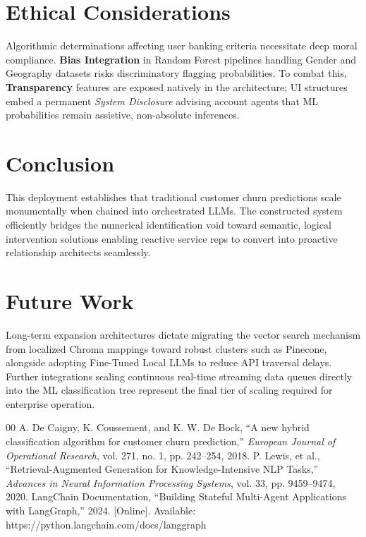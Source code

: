 \documentclass[conference, a4paper]{IEEEtran}
\begin{document}
\section{Ethical Considerations}
Algorithmic determinations affecting user banking criteria necessitate deep moral compliance. \textbf{Bias Integration} in Random Forest pipelines handling Gender and Geography datasets risks discriminatory flagging probabilities. To combat this, \textbf{Transparency} features are exposed natively in the architecture; UI structures embed a permanent \textit{System Disclosure} advising account agents that ML probabilities remain assistive, non-absolute inferences. 

\section{Conclusion}
This deployment establishes that traditional customer churn predictions scale monumentally when chained into orchestrated LLMs. The constructed system efficiently bridges the numerical identification void toward semantic, logical intervention solutions enabling reactive service reps to convert into proactive relationship architects seamlessly. 

\section{Future Work}
Long-term expansion architectures dictate migrating the vector search mechanism from localized Chroma mappings toward robust clusters such as Pinecone, alongside adopting Fine-Tuned Local LLMs to reduce API traversal delays. Further integrations scaling continuous real-time streaming data queues directly into the ML classification tree represent the final tier of scaling required for enterprise operation.

\begin{thebibliography}{00}
 A. De Caigny, K. Coussement, and K. W. De Bock, ``A new hybrid classification algorithm for customer churn prediction,'' \textit{European Journal of Operational Research}, vol. 271, no. 1, pp. 242--254, 2018.
 P. Lewis, et al., ``Retrieval-Augmented Generation for Knowledge-Intensive NLP Tasks,'' \textit{Advances in Neural Information Processing Systems}, vol. 33, pp. 9459--9474, 2020.
 LangChain Documentation, ``Building Stateful Multi-Agent Applications with LangGraph,'' 2024. [Online]. Available: https://python.langchain.com/docs/langgraph
\end{thebibliography}
\end{document}
